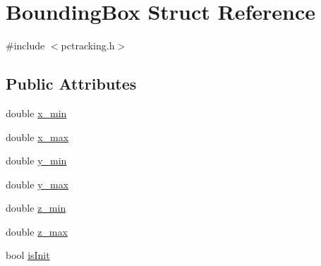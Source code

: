 \hypertarget{struct_bounding_box}{\section{\-Bounding\-Box \-Struct \-Reference}
\label{struct_bounding_box}
}


{\ttfamily \#include $<$pctracking.\-h$>$}

\subsection*{\-Public \-Attributes}
\begin{DoxyCompactItemize}
\item 
double \hyperlink{struct_bounding_box_adcf2b30a5b3b7fb9dc201d187c3ef358}{x\-\_\-min}
\item 
double \hyperlink{struct_bounding_box_a891ce5859cdc2098d6dde313da10ab04}{x\-\_\-max}
\item 
double \hyperlink{struct_bounding_box_aaa632fe0992cf6a336619c29aedb7014}{y\-\_\-min}
\item 
double \hyperlink{struct_bounding_box_afa281b502b7c7dd3504fc0c5bc33a74e}{y\-\_\-max}
\item 
double \hyperlink{struct_bounding_box_a8ff621230389e0ffd6d82db867cc96e6}{z\-\_\-min}
\item 
double \hyperlink{struct_bounding_box_a8844edaf778f133c4c932ea704d2b763}{z\-\_\-max}
\item 
bool \hyperlink{struct_bounding_box_a050835e8b28af7e22b1101284c1b9c56}{is\-Init}
\end{DoxyCompactItemize}



